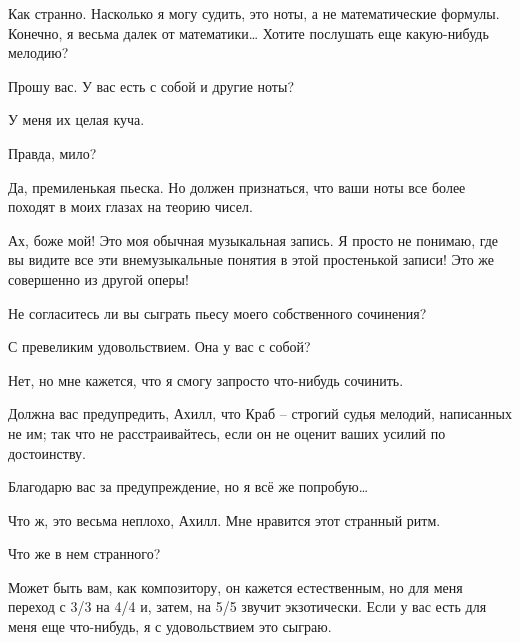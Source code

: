 \documentclass[../main.tex]{subfiles}
\begin{document}
\begin{dialogue}
 Как странно. Насколько я могу судить, это ноты, а не математические формулы. Конечно, я весьма далек от математики\ldots{} Хотите послушать еще какую-нибудь мелодию?

 Прошу вас. У вас есть с собой и другие ноты?

 У меня их целая куча.


Правда, мило?

 Да, премиленькая пьеска. Но должен признаться, что ваши ноты все более походят в моих глазах на теорию чисел.

 Ах, боже мой! Это моя обычная музыкальная запись. Я просто не понимаю, где вы видите все эти внемузыкальные понятия в этой простенькой записи! Это же совершенно из другой оперы!

 Не согласитесь ли вы сыграть пьесу моего собственного сочинения?

 С превеликим удовольствием. Она у вас с собой?

 Нет, но мне кажется, что я смогу запросто что-нибудь сочинить.

 Должна вас предупредить, Ахилл, что Краб \--- строгий судья мелодий, написанных не им; так что не расстраивайтесь, если он не оценит ваших усилий по достоинству.

 Благодарю вас за предупреждение, но я всё же попробую\ldots{}


 Что ж, это весьма неплохо, Ахилл. Мне нравится этот странный ритм.

 Что же в нем странного?

 Может быть вам, как композитору, он кажется естественным, но для меня переход с 3/3 на 4/4 и, затем, на 5/5 звучит экзотически. Если у вас есть для меня еще что-нибудь, я с удовольствием это сыграю.


\end{dialogue}
\end{document}
